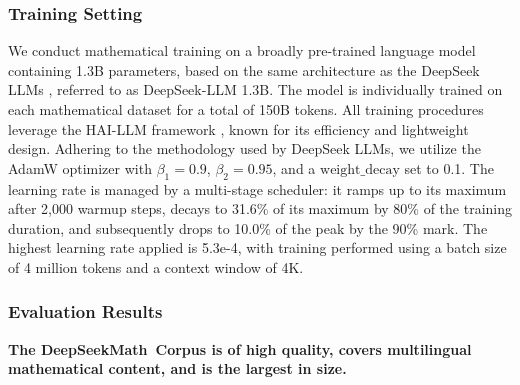 \begin{itemize}[topsep=0pt]
\subsubsection{Training Setting}
\label{sec:quality-policy}
We conduct mathematical training on a broadly pre-trained language model containing 1.3B parameters, based on the same architecture as the DeepSeek LLMs \citep{deepseek-llm}, referred to as DeepSeek-LLM 1.3B. The model is individually trained on each mathematical dataset for a total of 150B tokens. All training procedures leverage the HAI-LLM framework \citep{haillm}, known for its efficiency and lightweight design. Adhering to the methodology used by DeepSeek LLMs, we utilize the AdamW optimizer \citep{adamW} with $\beta_1=0.9$, $\beta_2=0.95$, and a $\mathrm{weight\_decay}$ set to 0.1. The learning rate is managed by a multi-stage scheduler: it ramps up to its maximum after 2,000 warmup steps, decays to 31.6\% of its maximum by 80\% of the training duration, and subsequently drops to 10.0\% of the peak by the 90\% mark. The highest learning rate applied is 5.3e-4, with training performed using a batch size of 4 million tokens and a context window of 4K.

\subsubsection{Evaluation Results}

\textbf{The DeepSeekMath~Corpus is of high quality, covers multilingual mathematical content, and is the largest in size.}


\end{itemize}
